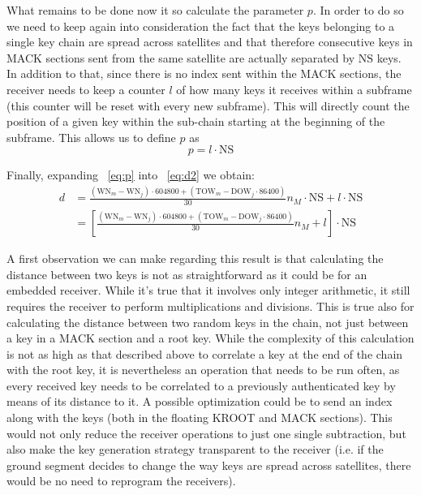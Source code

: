 What remains to be done now it so calculate the parameter $p$. In order to do
so we need to keep again into consideration the fact that the keys belonging
to a single key chain are spread across satellites and that therefore
consecutive keys in MACK sections sent from the same satellite are actually
separated by $\textrm{NS}$ keys. In addition to that, since there is no index
sent within the MACK sections, the receiver needs to keep a counter $l$ of how
many keys it receives within a subframe (this counter will be reset with every
new subframe). This will directly count the position of a given key within the
sub-chain starting at the beginning of the subframe. This allows us to define
$p$ as
\begin{equation}
  \label{eq:p}
  p = l \cdot \textrm{NS}
\end{equation}

Finally, expanding ~\ref{eq:p} into ~\ref{eq:d2} we obtain:
\begin{equation}
  \begin{aligned}
    d &= \frac{(\textrm{WN}_m - \textrm{WN}_j) \cdot 604800 + (\textrm{TOW}_m -
    \textrm{DOW}_j \cdot 86400)}{30} n_M \cdot \textrm{NS} + l \cdot \textrm{NS} \\
    &= \left[\frac{(\textrm{WN}_m - \textrm{WN}_j) \cdot 604800 + (\textrm{TOW}_m -
    \textrm{DOW}_j \cdot 86400)}{30} n_M  + l\right] \cdot \textrm{NS}
  \end{aligned}
\end{equation}

A first observation we can make regarding this result is that calculating the
distance between two keys is not as straightforward as it could be for an
embedded receiver. While it's true that it involves only integer arithmetic, it
still requires the receiver to perform multiplications and divisions. This is
true also for calculating the distance between two random keys in the chain, not
just between a key in a MACK section and a root key. While the complexity of
this calculation is not as high as that described above to correlate a key at
the end of the chain with the root key, it is nevertheless an operation that
needs to be run often, as every received key needs to be correlated to a
previously authenticated key by means of its distance to it. A possible
optimization could be to send an index along with the keys (both in the floating
KROOT and MACK sections). This would not only reduce the receiver operations to
just one single subtraction, but also make the key generation strategy
transparent to the receiver (i.e. if the ground segment decides to change the
way keys are spread across satellites, there would be no need to reprogram the
receivers).

